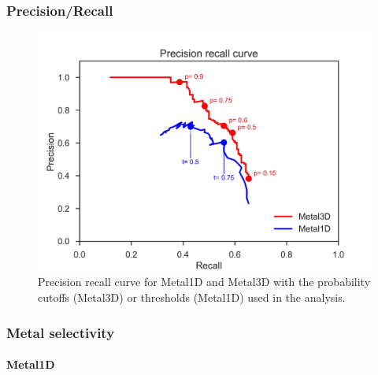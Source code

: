 \documentclass[  ASAPversion,
  ,
  9pt]{elife}
\newenvironment{fignos:tagged-figure}[1][]{
  \let\oldthefigure\thefigure
  \let\oldtheHfigure\theHfigure
  \renewcommand{\thefigure}{#1}
  \renewcommand{\theHfigure}{#1}
}{
  \let\thefigure\oldthefigure
  \let\theHfigure\oldtheHfigure
  \addtocounter{figure}{-1}
}
\begin{document}
\hypertarget{precisionrecall}{%
\subsubsection{Precision/Recall}\label{precisionrecall}}

\begin{fignos:tagged-figure}[S2]

\begin{figure}
\hypertarget{fig:precisionrecall}{%
\centering
\includegraphics{images/precisionrecall_0.5.jpg}
\caption{Precision recall curve for Metal1D and Metal3D with the probability cutoffs (Metal3D) or thresholds (Metal1D) used in the analysis.}\label{fig:precisionrecall}
}
\end{figure}

\end{fignos:tagged-figure}

\hypertarget{metal-selectivity}{%
\subsubsection{Metal selectivity}\label{metal-selectivity}}

\hypertarget{metal1d-2}{%
\paragraph{Metal1D}\label{metal1d-2}}
\end{document}
